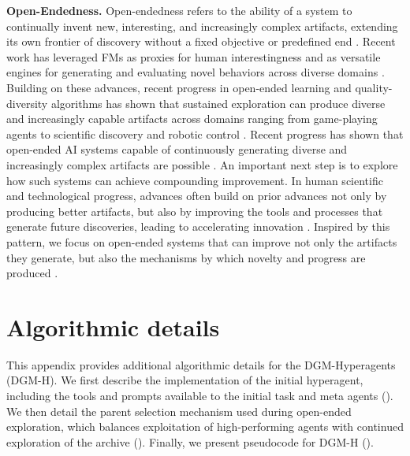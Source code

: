 \documentclass{article}
\begin{document}
\textbf{Open-Endedness.}
Open-endedness refers to the ability of a system to continually invent new, interesting, and increasingly complex artifacts, extending its own frontier of discovery without a fixed objective or predefined end \citep{stanley2017open, hughes2024open}. Recent work has leveraged FMs as proxies for human interestingness and as versatile engines for generating and evaluating novel behaviors across diverse domains \citep{zhangomni, faldoromni}. Building on these advances, recent progress in open-ended learning \citep{huautomated, zoph2017neural, colas2023augmenting, lehman2023evolution} and quality-diversity algorithms \citep{lehman2011evolving, mouret2015illuminating, bradley2023quality, samvelyan2024rainbow, dingquality, pourcel2023aces, coiffard2025overcoming, dharna2025foundation, yuan2026agenticred} has shown that sustained exploration can produce diverse and increasingly capable artifacts across domains ranging from game-playing agents \citep{klissarov2023motif, klissarovmaestromotif, wangvoyager} to scientific discovery \citep{lu2024discovering, lu2024ai, romera2024mathematical, novikov2025alphaevolve, audran2025does} and robotic control \citep{cully2015robots, li2024auto, grillotti2025tabula}. Recent progress has shown that open-ended AI systems capable of continuously generating diverse and increasingly complex artifacts are possible \citep{zhangomni, faldoromni, huautomated}. An important next step is to explore how such systems can achieve compounding improvement. In human scientific and technological progress, advances often build on prior advances not only by producing better artifacts, but also by improving the tools and processes that generate future discoveries, leading to accelerating innovation \citep{good1966speculations, kwa2025measuring}. Inspired by this pattern, we focus on open-ended systems that can improve not only the artifacts they generate, but also the mechanisms by which novelty and progress are produced \citep{clune2019ai, jiang2023general}.

\section{Algorithmic details}
\label{app:algo-details}

This appendix provides additional algorithmic details for the DGM-Hyperagents (DGM-H). We first describe the implementation of the initial hyperagent, including the tools and prompts available to the initial task and meta agents (). We then detail the parent selection mechanism used during open-ended exploration, which balances exploitation of high-performing agents with continued exploration of the archive (). Finally, we present pseudocode for DGM-H ().
\end{document}
